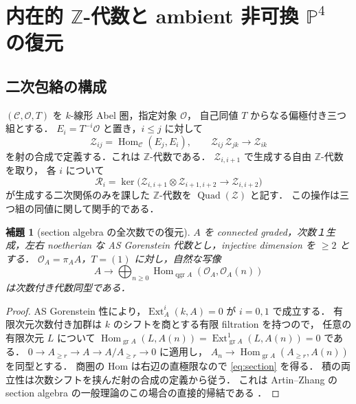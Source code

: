 \documentclass[11pt,a4paper]{ltjsarticle}
\numberwithin{equation}{section}
\newtheorem{lemma}[theorem]{補題}
\newcommand{\PP}{\mathbb P}
\newcommand{\OO}{\mathcal O}
\newcommand{\cZ}{\mathcal Z}
\newcommand{\qgr}{\operatorname{qgr}}
\newcommand{\Hom}{\operatorname{Hom}}
\newcommand{\Ext}{\operatorname{Ext}}
\begin{document}


\section{内在的 $\mathbb Z$-代数と ambient 非可換 $\PP^4$ の復元}\label{sec:reconstruction}
\subsection{二次包絡の構成}
$(\mathcal C,\OO,T)$ を $k$-線形 Abel 圏，指定対象 $\OO$，
自己同値 $T$ からなる偏極付き三つ組とする．
$E_i=T^{-i}\OO$ と置き，$i\le j$ に対して
\begin{equation}\label{eq:Zalg}
 \cZ_{ij}=\Hom_{\mathcal C}(E_j,E_i),\qquad
 \cZ_{ij}\,\cZ_{jk}\longrightarrow\cZ_{ik}
\end{equation}
を射の合成で定義する．これは $\mathbb Z$-代数である．
$\cZ_{i,i+1}$ で生成する自由 $\mathbb Z$-代数を取り，
各 $i$ について
\begin{equation}\label{eq:rel2}
 \mathcal R_i=
 \ker\bigl(\cZ_{i,i+1}\otimes\cZ_{i+1,i+2}
 \longrightarrow\cZ_{i,i+2}\bigr)
\end{equation}
が生成する二次関係のみを課した $\mathbb Z$-代数を
$\operatorname{Quad}(\cZ)$ と記す．
この操作は三つ組の同値に関して関手的である．

\begin{lemma}[section algebra の全次数での復元]\label{lem:section}
$A$ を connected graded，次数１生成，左右 noetherian な
AS Gorenstein 代数とし，injective dimension を $\ge2$ とする．
$\OO_A=\pi_A A$，$T=(1)$ に対し，自然な写像
\begin{equation}\label{eq:section}
 A\longrightarrow \bigoplus_{n\ge0}
 \Hom_{\qgr A}(\OO_A,\OO_A(n))
\end{equation}
は次数付き代数同型である．
\end{lemma}
\begin{proof}
AS Gorenstein 性により，$\Ext_A^i(k,A)=0$ が $i=0,1$ で成立する．
有限次元次数付き加群は $k$ のシフトを商とする有限 filtration を持つので，
任意の有限次元 $L$ について
$\Hom_{\operatorname{gr} A}(L,A(n))=
\Ext^1_{\operatorname{gr} A}(L,A(n))=0$ である．
$0\to A_{\ge r}\to A\to A/A_{\ge r}\to0$ に適用し，
$A_n\to\Hom_{\operatorname{gr}A}(A_{\ge r},A(n))$ を同型とする．
商圏の Hom は右辺の直極限なので \eqref{eq:section} を得る．
積の両立性は次数シフトを挟んだ射の合成の定義から従う．
これは Artin--Zhang の section algebra の一般理論のこの場合の直接的帰結である
\cite{AZ,YZ}．
\end{proof}
\end{document}
